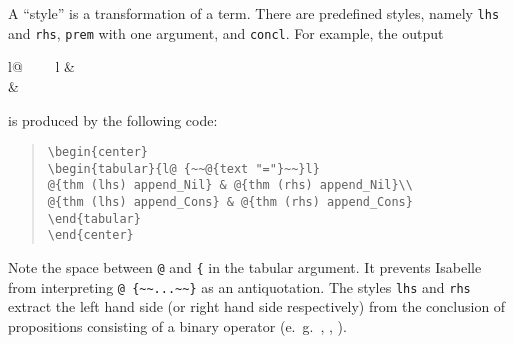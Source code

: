\begin{isabellebody}
\begin{isamarkuptext}
  A ``style'' is a transformation of a term. There are predefined
  styles, namely \verb!lhs! and \verb!rhs!, \verb!prem! with one argument, and \verb!concl!.
  For example, 
  the output
  \begin{center}
  \begin{tabular}{l@ {~~~~}l}
   & \\
   & 
  \end{tabular}
  \end{center}
  is produced by the following code:
  \begin{quote}
    \verb!\begin{center}!\\
    \verb!\begin{tabular}{l@ {~~!\verb!@!\verb!{text "="}~~}l}!\\
    \verb!@!\verb!{thm (lhs) append_Nil} & @!\verb!{thm (rhs) append_Nil}\\!\\
    \verb!@!\verb!{thm (lhs) append_Cons} & @!\verb!{thm (rhs) append_Cons}!\\
    \verb!\end{tabular}!\\
    \verb!\end{center}!
  \end{quote}
  Note the space between \verb!@! and \verb!{! in the tabular argument.
  It prevents Isabelle from interpreting \verb!@ {~~...~~}! 
  as an antiquotation. The styles \verb!lhs! and \verb!rhs!
  extract the left hand side (or right hand side respectively) from the
  conclusion of propositions consisting of a binary operator
  (e.~g.~, , ).


\end{isamarkuptext}
\end{isabellebody}
